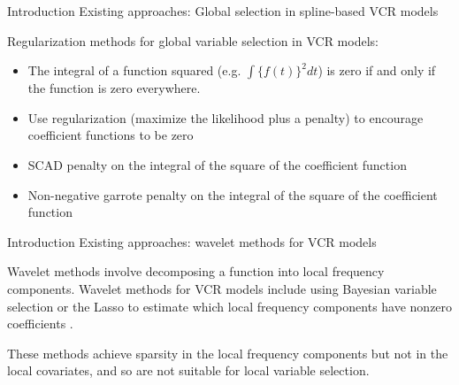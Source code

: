 \documentclass[12pt,t]{beamer}
\newcommand{\subt}[1]{{\footnotesize \color{subtitle} {#1}}}
\begin{document}
\begin{frame}{Introduction}
\subt{Existing approaches: Global selection in spline-based VCR models}

\bigskip
Regularization methods for global variable selection in VCR models:
\begin{itemize}
    \item The integral of a function squared (e.g. $\int \{f(t)\}^2 dt$) is zero if and only if the function is zero everywhere.
    \item Use regularization (maximize the likelihood plus a penalty) to encourage coefficient functions to be zero
    \item SCAD penalty \citep{Fan:2001} on the integral of the square of the coefficient function \citep{Wang:2008a}
    \item Non-negative garrote penalty \citep{Breiman:1995} on the integral of the square of the coefficient function \citep{Antoniadis:2012b}
\end{itemize}

\end{frame}




\begin{frame}{Introduction}
\subt{Existing approaches: wavelet methods for VCR models}

\bigskip
Wavelet methods involve decomposing a function into local frequency components. Wavelet methods for VCR models include using Bayesian variable selection or the Lasso to estimate which local frequency components have nonzero coefficients \citep{Shang-2011,Zhang-2011}.

\vspace{10mm}

These methods achieve sparsity in the local frequency components but not in the local covariates, and so are not suitable for local variable selection.

\end{frame}
\end{document}
